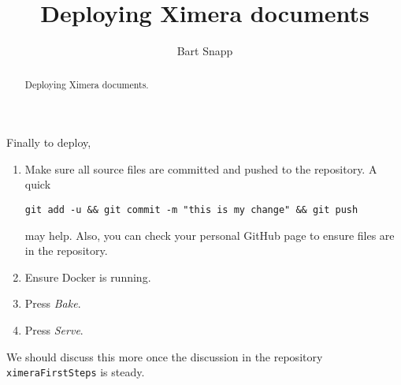 \documentclass{ximera}
\title{Deploying Ximera documents}
\author{Bart Snapp}
\begin{document}
\begin{abstract}
    Deploying Ximera documents.
\end{abstract}
\maketitle

Finally to deploy,
\begin{enumerate}
    \item Make sure all source files are committed and pushed to the repository. A quick 
\begin{verbatim}
git add -u && git commit -m "this is my change" && git push
\end{verbatim}
may help. Also, you can check your personal GitHub page to ensure files are in the repository.
\item Ensure Docker is running.
\item Press \textit{Bake}.
\item Press \textit{Serve}.
\end{enumerate}

We should discuss this more once the discussion in the repository \verb!ximeraFirstSteps! is steady.
\end{document}
